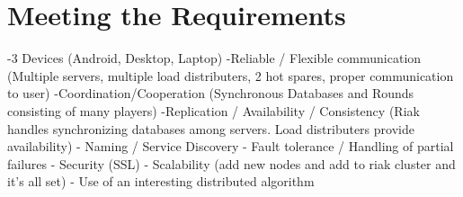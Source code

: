 \documentclass{dependencies/acm_proc_article-sp}
\begin{document}
\section {Meeting the Requirements}
-3 Devices (Android, Desktop, Laptop)
-Reliable / Flexible communication (Multiple servers, multiple load
distributers, 2 hot spares, proper communication to user)
-Coordination/Cooperation (Synchronous Databases and Rounds consisting of many
players)
-Replication / Availability / Consistency (Riak handles synchronizing databases
among servers. Load distributers provide availability)
- Naming / Service Discovery
- Fault tolerance / Handling of partial failures
- Security (SSL)
- Scalability (add new nodes and add to riak cluster and it's all set)
- Use of an interesting distributed algorithm

\newpage
%
%
%
%
\balancecolumns
\end{document}
